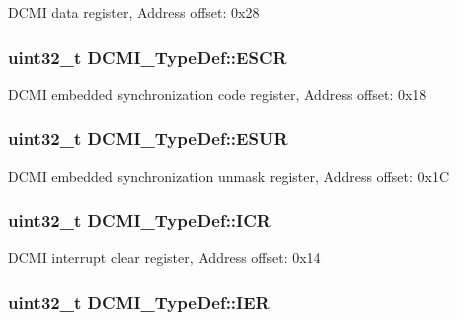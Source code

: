 D\-C\-M\-I data register, Address offset\-: 0x28 \hypertarget{struct_d_c_m_i___type_def_a52c16b920a3f25fda961d0cd29749433}{
\subsubsection[{E\-S\-C\-R}]{ uint32\-\_\-t D\-C\-M\-I\-\_\-\-Type\-Def\-::\-E\-S\-C\-R}}\label{struct_d_c_m_i___type_def_a52c16b920a3f25fda961d0cd29749433}
D\-C\-M\-I embedded synchronization code register, Address offset\-: 0x18 \hypertarget{struct_d_c_m_i___type_def_af00a94620e33f4eff74430ff25c12b94}{
\subsubsection[{E\-S\-U\-R}]{ uint32\-\_\-t D\-C\-M\-I\-\_\-\-Type\-Def\-::\-E\-S\-U\-R}}\label{struct_d_c_m_i___type_def_af00a94620e33f4eff74430ff25c12b94}
D\-C\-M\-I embedded synchronization unmask register, Address offset\-: 0x1\-C \hypertarget{struct_d_c_m_i___type_def_a0371fc07916e3043e1151eaa97e172c9}{
\subsubsection[{I\-C\-R}]{ uint32\-\_\-t D\-C\-M\-I\-\_\-\-Type\-Def\-::\-I\-C\-R}}\label{struct_d_c_m_i___type_def_a0371fc07916e3043e1151eaa97e172c9}
D\-C\-M\-I interrupt clear register, Address offset\-: 0x14 \hypertarget{struct_d_c_m_i___type_def_a91ce93b57d8382147574c678ee497c63}{
\subsubsection[{I\-E\-R}]{ uint32\-\_\-t D\-C\-M\-I\-\_\-\-Type\-Def\-::\-I\-E\-R}}\label{struct_d_c_m_i___type_def_a91ce93b57d8382147574c678ee497c63}
